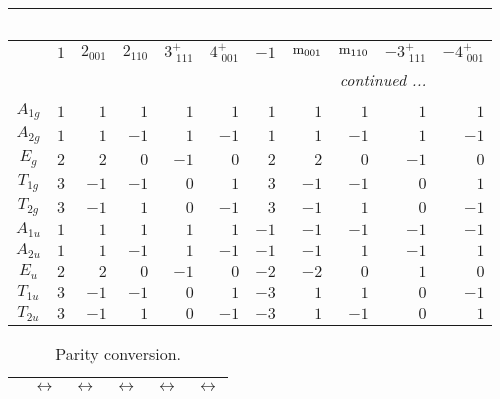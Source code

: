 \documentclass[fleqn,10pt,landscape]{article}
\begin{document}
\begin{itemize}
\begin{center}
\begin{longtable}{c|rrrrrrrrrr}
\multicolumn{10}{l}{\tablename\ \thetable{}} \\
 \hline \hline
 & $ 1 $ & $ 2{}_{001} $ & $ 2{}_{110} $ & $ 3^{+}_{\,\,111} $ & $ 4^{+}_{\,\,001} $ & $ -1 $ & $ {\rm m}_{001} $ & $ {\rm m}_{110} $ & $ -3^{+}_{\,\,111} $ & $ -4^{+}_{\,\,001} $ \\ \hline \endhead

 \hline \hline
\multicolumn{10}{r}{\footnotesize\it continued ...} \\ \endfoot

 \hline \hline
\multicolumn{10}{r}{} \\ \endlastfoot

$ A_{1g} $ & $ 1 $ & $ 1 $ & $ 1 $ & $ 1 $ & $ 1 $ & $ 1 $ & $ 1 $ & $ 1 $ & $ 1 $ & $ 1 $ \\
$ A_{2g} $ & $ 1 $ & $ 1 $ & $ -1 $ & $ 1 $ & $ -1 $ & $ 1 $ & $ 1 $ & $ -1 $ & $ 1 $ & $ -1 $ \\
$ E_{g} $ & $ 2 $ & $ 2 $ & $ 0 $ & $ -1 $ & $ 0 $ & $ 2 $ & $ 2 $ & $ 0 $ & $ -1 $ & $ 0 $ \\
$ T_{1g} $ & $ 3 $ & $ -1 $ & $ -1 $ & $ 0 $ & $ 1 $ & $ 3 $ & $ -1 $ & $ -1 $ & $ 0 $ & $ 1 $ \\
$ T_{2g} $ & $ 3 $ & $ -1 $ & $ 1 $ & $ 0 $ & $ -1 $ & $ 3 $ & $ -1 $ & $ 1 $ & $ 0 $ & $ -1 $ \\
$ A_{1u} $ & $ 1 $ & $ 1 $ & $ 1 $ & $ 1 $ & $ 1 $ & $ -1 $ & $ -1 $ & $ -1 $ & $ -1 $ & $ -1 $ \\
$ A_{2u} $ & $ 1 $ & $ 1 $ & $ -1 $ & $ 1 $ & $ -1 $ & $ -1 $ & $ -1 $ & $ 1 $ & $ -1 $ & $ 1 $ \\
$ E_{u} $ & $ 2 $ & $ 2 $ & $ 0 $ & $ -1 $ & $ 0 $ & $ -2 $ & $ -2 $ & $ 0 $ & $ 1 $ & $ 0 $ \\
$ T_{1u} $ & $ 3 $ & $ -1 $ & $ -1 $ & $ 0 $ & $ 1 $ & $ -3 $ & $ 1 $ & $ 1 $ & $ 0 $ & $ -1 $ \\
$ T_{2u} $ & $ 3 $ & $ -1 $ & $ 1 $ & $ 0 $ & $ -1 $ & $ -3 $ & $ 1 $ & $ -1 $ & $ 0 $ & $ 1 $ \\
\end{longtable}
\end{center}
\begin{center}
\renewcommand{\arraystretch}{1.0}
\begin{longtable}{cccccc}
\caption{Parity conversion.}
 \\
 \hline \hline
 & $\leftrightarrow$ & $\leftrightarrow$ & $\leftrightarrow$ & $\leftrightarrow$ & $\leftrightarrow$ \\ \hline \endfirsthead


\end{longtable}
\end{center}
\end{itemize}
\end{document}
